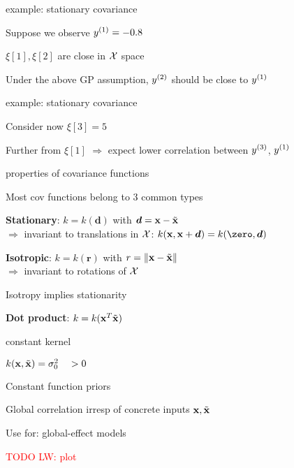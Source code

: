 \documentclass[11pt,compress,t,notes=noshow, xcolor=table]{beamer}
\begin{document}
\begin{framei}{example: stationary covariance}
\item Suppose we observe $\yi[1] = -0.8$
\item $\xi[1], \xi[2]$ are close in $\Xspace$ space
\item Under the above GP assumption, $\yi[2]$ should be close to $\yi[1]$ 
\vfill
{}
\end{framei}

\begin{framei}{example: stationary covariance}
\item Consider now $\xi[3] = 5$
\item Further from $\xi[1]$ $\Rightarrow$ expect lower correlation between $\yi[3]$, $\yi[1]$ 
\vfill
{}
\end{framei}

\begin{framei}[sep=L]{properties of covariance functions}
\item Most cov functions belong to 3 common types
\item \textbf{Stationary}: $k = k(\bm{d})$ with $\bm{d} = \xv - \tilde{\xv}$ \\
$\Rightarrow$ invariant to translations in $\Xspace$: $k(\xv, \xv + \bm{d}) = k(\zero, \bm{d})$
\item \textbf{Isotropic}: $k = k(\bm{r})$ with $r = \| \xv - \tilde{\xv} \|$ \\
$\Rightarrow$ invariant to rotations of $\Xspace$
\item Isotropy implies stationarity
\item \textbf{Dot product}: $k = k(\xv^T \tilde{\xv})$
\end{framei}

\begin{framei}{constant kernel}
\item $k(\xv, \tilde{\xv}) = \sigma^2_0 \quad > 0$
\item Constant function priors
\item Global correlation irresp of concrete inputs $\xv, \tilde{\xv}$
\item Use for: global-effect models
\item \textcolor{red}{TODO LW: plot}
\end{framei}
\end{document}
